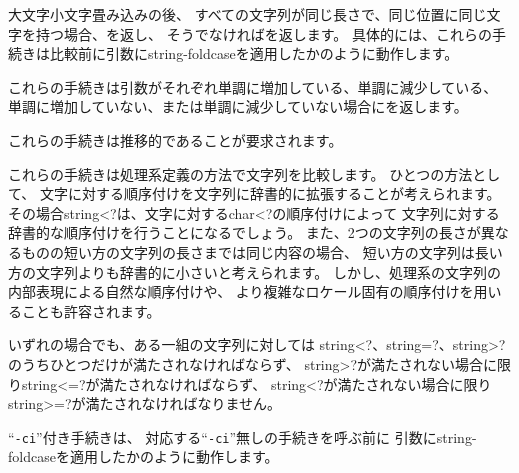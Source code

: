 \begin{entry}{%
}

大文字小文字畳み込みの後、
すべての文字列が同じ長さで、同じ位置に同じ文字を持つ場合、\schtrue{}を返し、
そうでなければ\schfalse{}を返します。
具体的には、これらの手続きは比較前に引数に{\cf string-foldcase}を適用したかのように動作します。

\end{entry}


\begin{entry}{%
}

これらの手続きは引数がそれぞれ単調に増加している、単調に減少している、
単調に増加していない、または単調に減少していない場合に\schtrue{}を返します。

これらの手続きは推移的であることが要求されます。

これらの手続きは処理系定義の方法で文字列を比較します。
ひとつの方法として、
文字に対する順序付けを文字列に辞書的に拡張することが考えられます。
その場合{\cf string<?}は、文字に対する{\cf char<?}の順序付けによって
文字列に対する辞書的な順序付けを行うことになるでしょう。
また、2つの文字列の長さが異なるものの短い方の文字列の長さまでは同じ内容の場合、
短い方の文字列は長い方の文字列よりも辞書的に小さいと考えられます。
しかし、処理系の文字列の内部表現による自然な順序付けや、
より複雑なロケール固有の順序付けを用いることも許容されます。

いずれの場合でも、ある一組の文字列に対しては
{\cf string<?}、{\cf string=?}、{\cf string>?}
のうちひとつだけが満たされなければならず、
{\cf string>?}が満たされない場合に限り{\cf string<=?}が満たされなければならず、
{\cf string<?}が満たされない場合に限り{\cf string>=?}が満たされなければなりません。

``{\tt -ci}''付き手続きは、
対応する``{\tt -ci}''無しの手続きを呼ぶ前に
引数に{\cf string-foldcase}を適用したかのように動作します。


\end{entry}

